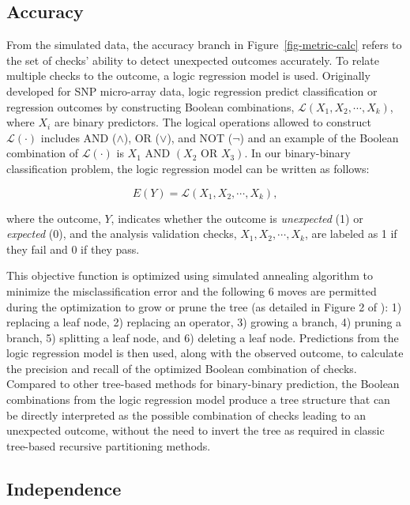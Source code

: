 \documentclass[
  12pt,
]{interact}
\begin{document}
\subsection{Accuracy}\label{accuracy}

From the simulated data, the accuracy branch in
Figure~\ref{fig-metric-calc} refers to the set of checks' ability to
detect unexpected outcomes accurately. To relate multiple checks to the
outcome, a logic regression model \citep{ruczinski_logic_2003} is used.
Originally developed for SNP micro-array data, logic regression predict
classification or regression outcomes by constructing Boolean
combinations, \(\mathcal{L}(X_1, X_2, \cdots, X_k)\), where \(X_i\) are
binary predictors. The logical operations allowed to construct
\(\mathcal{L(\cdot)}\) includes AND (\(\land\)), OR (\(\lor\)), and NOT
(\(\neg\)) and an example of the Boolean combination of
\(\mathcal{L(\cdot)}\) is \(X_1 \text{ AND } (X_2 \text{ OR } X_3)\). In
our binary-binary classification problem, the logic regression model can
be written as follows:

\[E(Y) = \mathcal{L}(X_1, X_2, \cdots, X_k),\]

where the outcome, \(Y\), indicates whether the outcome is
\emph{unexpected} (1) or \emph{expected} (0), and the analysis
validation checks, \(X_1, X_2, \cdots, X_k\), are labeled as 1 if they
fail and 0 if they pass.

This objective function is optimized using simulated annealing algorithm
to minimize the misclassification error and the following 6 moves are
permitted during the optimization to grow or prune the tree (as detailed
in Figure 2 of \citet{ruczinski_logic_2003}): 1) replacing a leaf node,
2) replacing an operator, 3) growing a branch, 4) pruning a branch, 5)
splitting a leaf node, and 6) deleting a leaf node. Predictions from the
logic regression model is then used, along with the observed outcome, to
calculate the precision and recall of the optimized Boolean combination
of checks. Compared to other tree-based methods for binary-binary
prediction, the Boolean combinations from the logic regression model
produce a tree structure that can be directly interpreted as the
possible combination of checks leading to an unexpected outcome, without
the need to invert the tree as required in classic tree-based recursive
partitioning methods.

\subsection{Independence}\label{independence}
\end{document}
